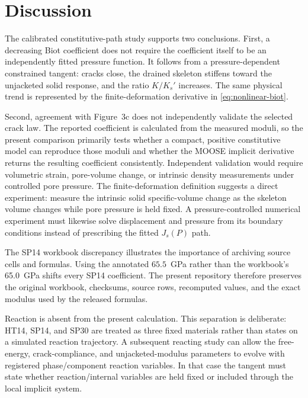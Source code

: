 \section{Discussion}

The calibrated constitutive-path study supports two conclusions. First, a decreasing Biot
coefficient does not require the coefficient itself to be an independently
fitted pressure function.  It follows from a pressure-dependent constrained
tangent: cracks close, the drained skeleton stiffens toward the unjacketed
solid response, and the ratio \(K/K_s'\) increases.  The same physical trend is
represented by the finite-deformation derivative in
\cref{eq:nonlinear-biot}.

Second, agreement with Figure~3c does not independently validate the selected
crack law. The reported coefficient is calculated from the measured moduli, so
the present comparison primarily tests whether a compact, positive constitutive
model can reproduce those moduli and whether the MOOSE implicit derivative
returns the resulting coefficient consistently.  Independent validation would
require volumetric strain, pore-volume change, or intrinsic density measurements
under controlled pore pressure. The finite-deformation definition suggests a
direct experiment: measure the intrinsic solid specific-volume change as the
skeleton volume changes while pore pressure is held fixed. A pressure-controlled
numerical experiment must likewise solve displacement and pressure from its
boundary conditions instead of prescribing the fitted \(J_s(P)\) path.

The SP14 workbook discrepancy illustrates the importance of archiving source
cells and formulas.  Using the annotated \(65.5\)~GPa rather than the workbook's
65.0~GPa shifts every SP14 coefficient.  The present repository therefore
preserves the original workbook, checksums, source rows, recomputed values, and
the exact modulus used by the released formulas.

Reaction is absent from the present calculation.  This separation is deliberate:
HT14, SP14, and SP30 are treated as three fixed materials rather than states on
a simulated reaction trajectory.  A subsequent reacting study can allow the
free-energy, crack-compliance, and unjacketed-modulus parameters to evolve with
registered phase/component reaction variables.  In that case the tangent must
state whether reaction/internal variables are held fixed or included through
the local implicit system.
